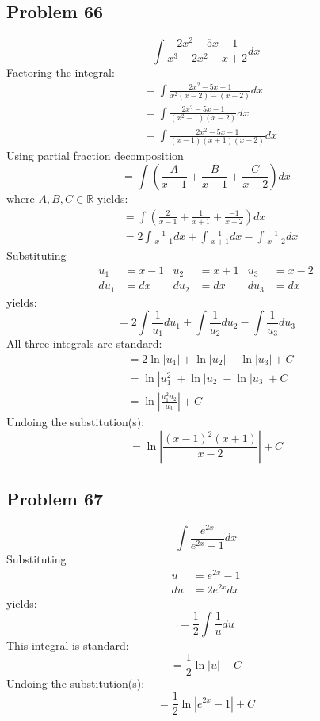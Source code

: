 \documentclass{article}
\begin{document}
\subsection*{Problem 66}
$$\int\frac{2x^2-5x-1}{x^3-2x^2-x+2}dx$$
Factoring the integral:
\begin{align*}
&=\int\frac{2x^2-5x-1}{x^2(x-2)-(x-2)}dx \\
&=\int\frac{2x^2-5x-1}{(x^2-1)(x-2)}dx \\
&=\int\frac{2x^2-5x-1}{(x-1)(x+1)(x-2)}dx
\end{align*}
Using partial fraction decomposition
$$=\int\left(\frac{A}{x-1}+\frac{B}{x+1}+\frac{C}{x-2}\right)dx$$
where $A,B,C\in\mathbb{R}$ yields:
\begin{align*}
&=\int\left(\frac{2}{x-1}+\frac{1}{x+1}+\frac{-1}{x-2}\right)dx \\
&=2\int\frac{1}{x-1}dx+\int\frac{1}{x+1}dx-\int\frac{1}{x-2}dx
\end{align*}
Substituting
\begin{align*}
u_1&=x-1 &u_2&=x+1 &u_3&=x-2 \\
du_1&=dx &du_2&=dx &du_3&=dx
\end{align*}
yields:
$$=2\int\frac{1}{u_1}du_1+\int\frac{1}{u_2}du_2-\int\frac{1}{u_3}du_3$$
All three integrals are standard:
\begin{align*}
&=2\ln\left|u_1\right|+\ln\left|u_2\right|-\ln\left|u_3\right|+C \\
&=\ln\left|u_1^2\right|+\ln\left|u_2\right|-\ln\left|u_3\right|+C \\
&=\ln\left|\frac{u_1^2u_2}{u_3}\right|+C
\end{align*}
Undoing the substitution(s):
$$=\ln\left|\frac{(x-1)^2(x+1)}{x-2}\right|+C$$
\subsection*{Problem 67}
$$\int\frac{e^{2x}}{e^{2x}-1}dx$$
Substituting
\begin{align*}
u&=e^{2x}-1 \\
du&=2e^{2x}dx
\end{align*}
yields:
$$=\frac{1}{2}\int\frac{1}{u}du$$
This integral is standard:
$$=\frac{1}{2}\ln|u|+C$$
Undoing the substitution(s):
$$=\frac{1}{2}\ln\left|e^{2x}-1\right|+C$$
\end{document}
